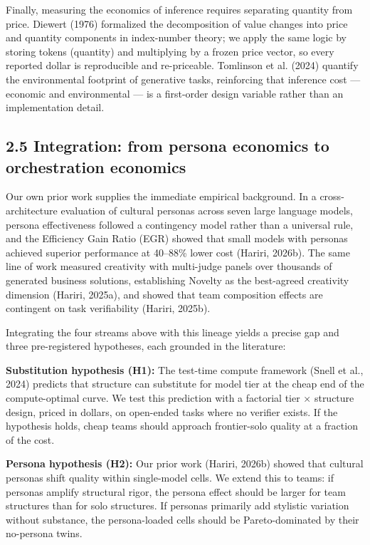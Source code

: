 \documentclass[11pt,a4paper]{article}
\begin{document}
Finally, measuring the economics of inference requires separating quantity
from price. Diewert (1976) formalized the decomposition of value changes
into price and quantity components in index-number theory; we apply the same
logic by storing tokens (quantity) and multiplying by a frozen price vector,
so every reported dollar is reproducible and re-priceable. Tomlinson et al.
(2024) quantify the environmental footprint of generative tasks, reinforcing
that inference cost — economic and environmental — is a first-order design
variable rather than an implementation detail.

\subsection{2.5 Integration: from persona economics to orchestration economics}

Our own prior work supplies the immediate empirical background. In a
cross-architecture evaluation of cultural personas across seven large
language models, persona effectiveness followed a contingency model rather
than a universal rule, and the Efficiency Gain Ratio (EGR) showed that small
models with personas achieved superior performance at 40–88\% lower cost
(Hariri, 2026b). The same line of work measured creativity with multi-judge
panels over thousands of generated business solutions, establishing
Novelty as the best-agreed creativity dimension (Hariri, 2025a), and showed
that team composition effects are contingent on task verifiability
(Hariri, 2025b).

Integrating the four streams above with this lineage yields a precise gap
and three pre-registered hypotheses, each grounded in the literature:

\textbf{Substitution hypothesis (H1):} The test-time compute framework (Snell et
al., 2024) predicts that structure can substitute for model tier at the
cheap end of the compute-optimal curve. We test this prediction with a
factorial tier × structure design, priced in dollars, on open-ended tasks
where no verifier exists. If the hypothesis holds, cheap teams should
approach frontier-solo quality at a fraction of the cost.

\textbf{Persona hypothesis (H2):} Our prior work (Hariri, 2026b) showed that
cultural personas shift quality within single-model cells. We extend this
to teams: if personas amplify structural rigor, the persona effect should be
larger for team structures than for solo structures. If personas primarily
add stylistic variation without substance, the persona-loaded cells should
be Pareto-dominated by their no-persona twins.
\end{document}
